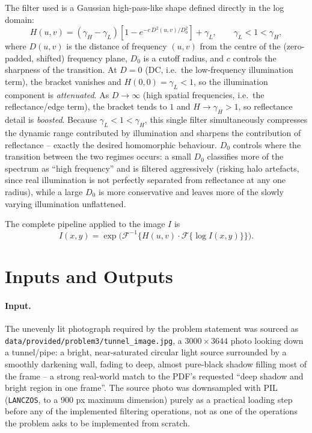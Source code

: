 \documentclass[11pt]{article}
\begin{document}
The filter used is a Gaussian high-pass-like shape defined directly in the log domain:
\begin{equation}
  H(u,v) = (\gamma_H - \gamma_L)\left[1 - e^{-c\,D^2(u,v)/D_0^2}\right] + \gamma_L,
  \qquad \gamma_L < 1 < \gamma_H,
  \label{eq:homfilter}
\end{equation}
where $D(u,v)$ is the distance of frequency $(u,v)$ from the centre of the (zero-padded,
shifted) frequency plane, $D_0$ is a cutoff radius, and $c$ controls the sharpness of the
transition. At $D=0$ (DC, i.e.\ the low-frequency illumination term), the bracket
vanishes and $H(0,0) = \gamma_L < 1$, so the illumination component is \emph{attenuated}.
As $D \to \infty$ (high spatial frequencies, i.e.\ the reflectance/edge term), the
bracket tends to $1$ and $H \to \gamma_H > 1$, so reflectance detail is \emph{boosted}.
Because $\gamma_L<1<\gamma_H$, this single filter simultaneously compresses the dynamic
range contributed by illumination and sharpens the contribution of reflectance -- exactly
the desired homomorphic behaviour. $D_0$ controls where the transition between the two
regimes occurs: a small $D_0$ classifies more of the spectrum as ``high frequency'' and
is filtered aggressively (risking halo artefacts, since real illumination is not
perfectly separated from reflectance at any one radius), while a large $D_0$ is more
conservative and leaves more of the slowly varying illumination unflattened.

The complete pipeline applied to the image $I$ is
\begin{equation}
  \hat I(x,y) = \exp\Big(\mathcal{F}^{-1}\big\{H(u,v)\cdot \mathcal{F}\{\log I(x,y)\}\big\}\Big).
  \label{eq:pipeline}
\end{equation}

\section{Inputs and Outputs}

\paragraph{Input.} The unevenly lit photograph required by the problem statement was
sourced as \texttt{data/provided/problem3/tunnel\_image.jpg}, a $3000\times 3644$ photo
looking down a tunnel/pipe: a bright, near-saturated circular light source surrounded by
a smoothly darkening wall, fading to deep, almost pure-black shadow filling most of the
frame -- a strong real-world match to the PDF's requested ``deep shadow and bright region
in one frame''. The source photo was downsampled with PIL (\texttt{LANCZOS}, to a 900 px
maximum dimension) purely as a practical loading step before any of the implemented
filtering operations, not as one of the operations the problem asks to be implemented
from scratch.
\end{document}
